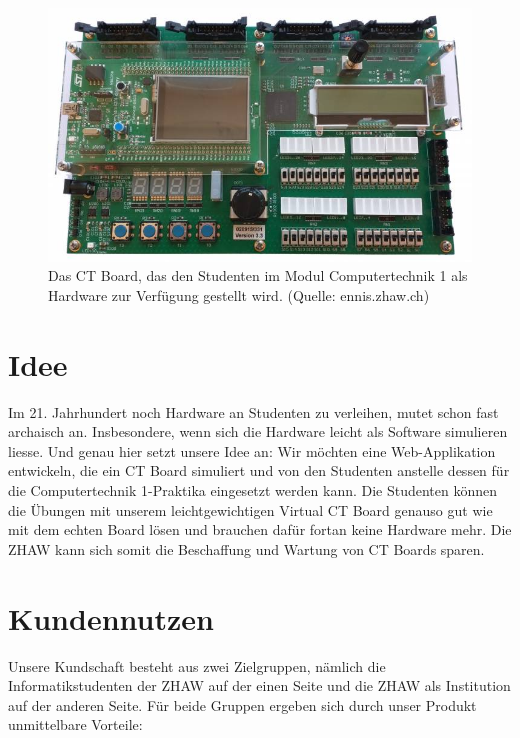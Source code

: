 \documentclass[10pt]{article}
\begin{document}
\begin{figure}[h]
\includegraphics[width=\textwidth]{ctboard}
\caption{Das CT Board, das den Studenten im Modul \glqq Computertechnik 1\grqq{} als Hardware zur Verfügung gestellt wird. (Quelle: ennis.zhaw.ch)}
\label{ctboard}
\end{figure}

\section{Idee}

Im 21. Jahrhundert noch Hardware an Studenten zu verleihen, mutet schon fast archaisch an. Insbesondere, wenn sich die Hardware leicht als Software simulieren liesse. Und genau hier setzt unsere Idee an: Wir möchten eine Web-Applikation entwickeln, die ein CT Board simuliert und von den Studenten anstelle dessen für die \glqq Computertechnik 1\grqq-Praktika eingesetzt werden kann. Die Studenten können die Übungen mit unserem leichtgewichtigen \glqq Virtual CT Board\grqq{} genauso gut wie mit dem echten Board lösen und brauchen dafür fortan keine Hardware mehr. Die ZHAW kann sich somit die Beschaffung und Wartung von CT Boards sparen.

\section{Kundennutzen}

Unsere Kundschaft besteht aus zwei Zielgruppen, nämlich die Informatikstudenten der ZHAW auf der einen Seite und die ZHAW als Institution auf der anderen Seite. Für beide Gruppen ergeben sich durch unser Produkt unmittelbare Vorteile:
\end{document}
